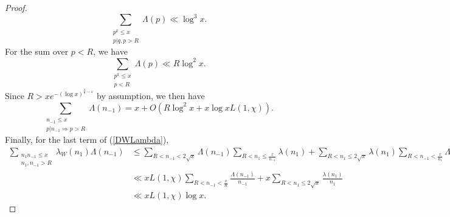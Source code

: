 \documentclass{amsart}
\begin{document}
\begin{proof}
$$\sum_{\substack{p^k\leq x \\ p|q,p>R}}\Lambda(p)\ll \log^3 x.$$
For the sum over $p<R$, we have
$$\sum_{\substack{p^k\leq x\\ p<R }}\Lambda(p)\ll R\log^2 x.$$
Since $R>xe^{-(\log x)^{\frac 35-\varepsilon}}$ by assumption, we then have
$$\sum_{\substack{n_{-1}\leq x \\ p|n_{-1}\Rightarrow p>R}}\Lambda\left(n_{-1}\right)=x+O\left(R\log^2 x+x\log xL(1,\chi)\right).$$
Finally, for the last term of (\ref{DWLambda}),
\begin{align*}
\sum_{\substack{n_1n_{-1}\leq x \\ n_1,n_{-1}>R}}\lambda_W\left(n_1\right) \Lambda\left(n_{-1}\right)
&\leq \sum_{R<n_{-1}<2\sqrt{x}}\Lambda\left(n_{-1}\right)\sum_{R<n_1\leq \frac x{n_{-1}} }\lambda\left(n_1\right) +\sum_{R<n_1\leq 2\sqrt x }\lambda\left(n_1\right)\sum_{R<n_{-1}<\frac x{n_{1}}}\Lambda\left(n_{-1}\right) \\
&\ll xL(1,\chi)\sum_{R<n_{-1}<\frac xR}\frac{\Lambda\left(n_{-1}\right)}{n_{-1}}+x\sum_{R<n_1\leq 2\sqrt x }\frac{\lambda\left(n_1\right)}{n_1}\\
&\ll xL(1,\chi)\log x.
\end{align*}
\end{proof}
\end{document}
